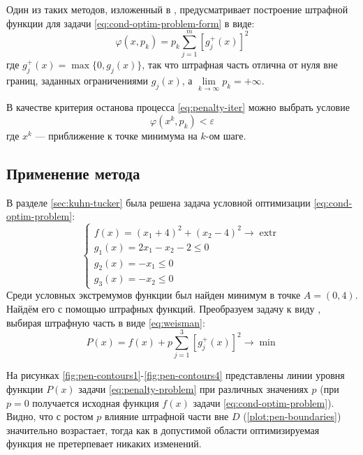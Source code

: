 \documentclass{article}
\renewcommand{\epsilon}{\varepsilon}
\renewcommand{\phi}{\varphi}
\renewcommand{\leq}{\leqslant}
\DeclareMathOperator{\extr}{extr}
\theoremstyle{remark}
\theoremstyle{definition}
\numberwithin{equation}{section}
\begin{document}
Один из таких методов, изложенный в \cite{himmelblau75},
предусматривает построение штрафной функции для задачи
\eqref{eq:cond-optim-problem-form} в виде:
\begin{equation}
  \label{eq:weisman}
  \phi(x, p_k) = p_k \sum_{j=1}^m{ \left [ g_j^+(x) \right ]^2}
\end{equation}
где $g_j^+(x) = \max\{0, g_j(x)\}$, так что штрафная часть отлична от
нуля вне границ, заданных ограничениями $g_j(x)$, а
$\lim\limits_{k\to\infty}{p_k} = +\infty$.

В качестве критерия останова процесса \eqref{eq:penalty-iter} можно
выбрать условие
\begin{equation*}
  \phi(x^k, p_k) < \epsilon
\end{equation*}
где $x^k$ — приближение к точке минимума на $k$-ом шаге.

\subsection{Применение метода}
\label{sec:penalty-usage}

В разделе \ref{sec:kuhn-tucker} была решена задача условной
оптимизации \eqref{eq:cond-optim-problem}:
\begin{equation*}
  \begin{cases}
    f(x) = (x_1+4)^2 + (x_2-4)^2 \to \extr \\
    g_1(x) = 2x_1 - x_2 - 2 \leq 0 \\
    g_2(x) = -x_1 \leq 0 \\
    g_3(x) = -x_2 \leq 0
  \end{cases}
\end{equation*}
Среди условных экстремумов функции был найден минимум в точке $A = (0,
4)$. Найдём его с помощью штрафных функций. Преобразуем задачу к виду
\label{eq:penalty-iter}, выбирая штрафную часть в виде
\eqref{eq:weisman}:
\begin{equation}
  \label{eq:penalty-problem}
  P(x) = f(x) + p \sum_{j=1}^3{ \left [ g_j^+(x) \right ]^2} \to \min
\end{equation}

На рисунках \ref{fig:pen-contours1}-\ref{fig:pen-contours4}
представлены линии уровня функции $P(x)$ задачи
\eqref{eq:penalty-problem} при различных значениях $p$ (при $p=0$
получается исходная функция $f(x)$ задачи
\eqref{eq:cond-optim-problem}). Видно, что с ростом $p$ влияние
штрафной части вне $D$ (\ref{plot:pen-boundaries}) значительно
возрастает, тогда как в допустимой области оптимизируемая функция не
претерпевает никаких изменений.
\end{document}
